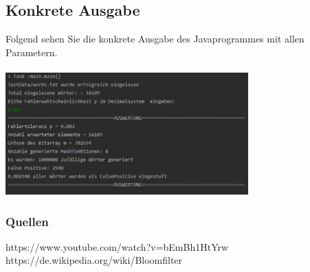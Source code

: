 \documentclass[16 pt]{article}
\begin{document}
\subsection{Konkrete Ausgabe}
Folgend sehen Sie die konkrete Ausgabe des Javaprogrammes mit allen Parametern. \\
\\ \includegraphics[width=0.7\textwidth]{Ausgabe_Java.png}
\subsubsection{Quellen}
https://www.youtube.com/watch?v=bEmBh1HtYrw
\\ https://de.wikipedia.org/wiki/Bloomfilter
\end{document}
